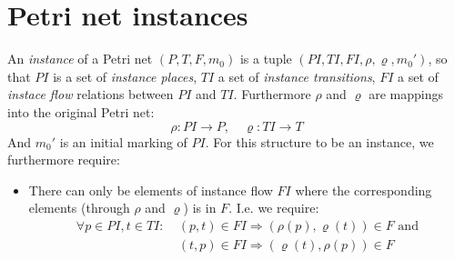 \documentclass[12pt, a4paper]{article}
\numberwithin{equation}{section}
\begin{document}
\section{Petri net instances}
An \textit{instance} of a Petri net $(P, T, F, m_0)$ is a tuple $(PI, TI, FI, \rho,\varrho, m_0')$, so that $PI$ is a set of \textit{instance places}, $TI$ a set of \textit{instance transitions}, $FI$ a set of \textit{instace flow} relations between $PI$ and $TI$. Furthermore $\rho$ and $\varrho$ are  mappings into the original Petri net:
\begin{equation}
\rho: PI\rightarrow P,\quad\varrho: TI\rightarrow T
\end{equation}
And $m_0'$ is an initial marking of $PI$. For this structure to be an instance, we furthermore require:
\begin{itemize}
\item There can only be elements of instance flow $FI$ where the corresponding elements (through $\rho$ and $\varrho$) is in $F$. I.e. we require:
\begin{align}
\forall p\in PI, t\in TI:\ &(p,t)\in FI\Rightarrow(\rho(p),\varrho(t))\in F\textrm{ and}\\
&(t,p)\in FI\Rightarrow(\varrho(t),\rho(p))\in F
\end{align}
\end{itemize}
\end{document}
